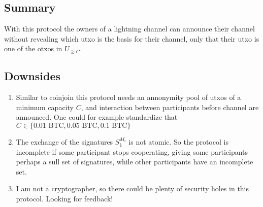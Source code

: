 \documentclass[]{article}
\begin{document}
\subsection{ Summary}


With this protocol the owners of a lightning channel can announce their channel without revealing which utxo is the basis for their channel, only that their utxo is one of the otxos in  $U_{\geq C} $.

\subsection{ Downsides}

\begin{enumerate}
 \item Similar to coinjoin this protocol needs an annonymity pool of utxos of a minimum capacity $C$, and interaction between participants before channel are announced.   One could for example standardize that $C \in \{0.01 \text{ BTC}, 0.05 \text{ BTC}, 0.1 \text{ BTC}\}$
 \item The exchange of the signatures $S_1^{M_i}$ is not atomic. So the protocol is incomplete if some participant stops cooperating, giving some participants perhaps a sull set of signatures, while other participants have an incomplete set.
 \item I am not a cryptographer, so there could be plenty of security holes in this protocol. Looking for feedback!


\end{enumerate}
\end{document}

